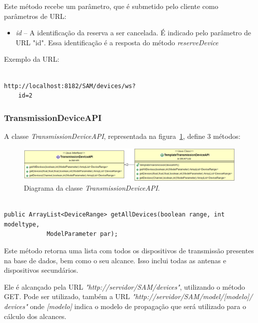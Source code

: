 Este método recebe um parâmetro, que é submetido pelo cliente como parâmetros de URL:
\begin{itemize}
\item \textit{id} -- A identificação da reserva a ser cancelada. É indicado pelo parâmetro de URL "id". Essa identificação é a resposta do método \textit{reserveDevice}
\end{itemize}

Exemplo da URL:

\begin{lstlisting}	

http://localhost:8182/SAM/devices/ws?
	id=2

\end{lstlisting}


\subsubsection{TransmissionDeviceAPI}

A classe \textit{TransmissionDeviceAPI}, representada na figura~\ref{fig:TransmissionDeviceAPI}, define 3 métodos:

\begin{figure}[htb]
\centering
\includegraphics[width=1.0\textwidth]{figs/transdeviceapi}
\caption[\textit{Diagrama da classe \textit{TransmissionDeviceAPI} }.]
{Diagrama da classe \textit{TransmissionDeviceAPI}.}
\label{fig:TransmissionDeviceAPI}
\end{figure} 


\begin{lstlisting}	

public ArrayList<DeviceRange> getAllDevices(boolean range, int modeltype, 
			ModelParameter par);

\end{lstlisting}

Este método retorna uma lista com todos os dispositivos de transmissão presentes na base de dados, bem como o seu alcance. Isso inclui todas as antenas e dispositivos secundários.

Ele é alcançado pela URL \textit{"http://servidor/SAM/devices"}, utilizando o método GET. Pode ser utilizado, também a URL \textit{"http://servidor/SAM/model/[modelo]/ devices"} onde \textit{[modelo]} indica o modelo de propagação que será utilizado para o cálculo dos alcances.

